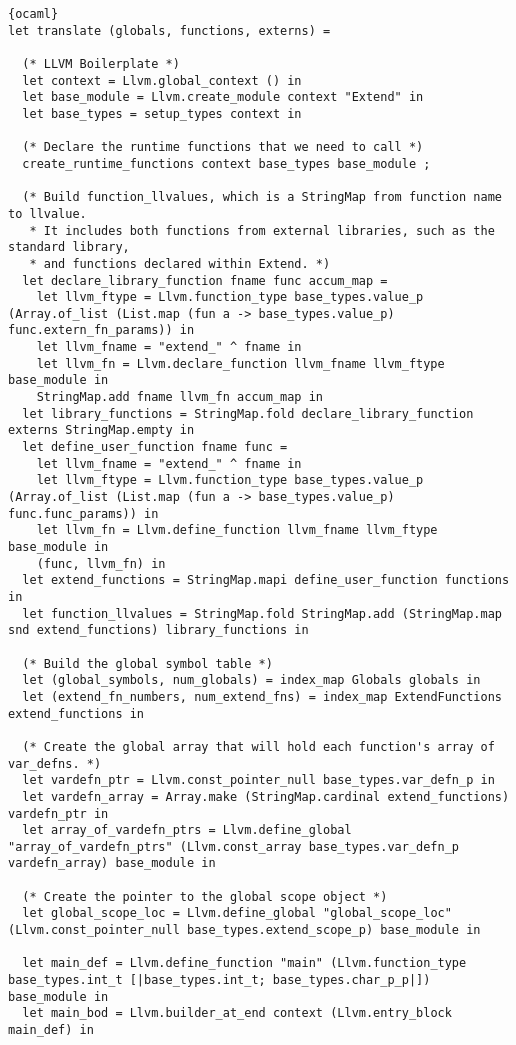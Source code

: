 \begin{lstlisting}{ocaml}
let translate (globals, functions, externs) =

  (* LLVM Boilerplate *)
  let context = Llvm.global_context () in
  let base_module = Llvm.create_module context "Extend" in
  let base_types = setup_types context in

  (* Declare the runtime functions that we need to call *)
  create_runtime_functions context base_types base_module ;

  (* Build function_llvalues, which is a StringMap from function name to llvalue.
   * It includes both functions from external libraries, such as the standard library,
   * and functions declared within Extend. *)
  let declare_library_function fname func accum_map =
    let llvm_ftype = Llvm.function_type base_types.value_p (Array.of_list (List.map (fun a -> base_types.value_p) func.extern_fn_params)) in
    let llvm_fname = "extend_" ^ fname in
    let llvm_fn = Llvm.declare_function llvm_fname llvm_ftype base_module in
    StringMap.add fname llvm_fn accum_map in
  let library_functions = StringMap.fold declare_library_function externs StringMap.empty in
  let define_user_function fname func =
    let llvm_fname = "extend_" ^ fname in
    let llvm_ftype = Llvm.function_type base_types.value_p (Array.of_list (List.map (fun a -> base_types.value_p) func.func_params)) in
    let llvm_fn = Llvm.define_function llvm_fname llvm_ftype base_module in
    (func, llvm_fn) in
  let extend_functions = StringMap.mapi define_user_function functions in
  let function_llvalues = StringMap.fold StringMap.add (StringMap.map snd extend_functions) library_functions in

  (* Build the global symbol table *)
  let (global_symbols, num_globals) = index_map Globals globals in
  let (extend_fn_numbers, num_extend_fns) = index_map ExtendFunctions extend_functions in

  (* Create the global array that will hold each function's array of var_defns. *)
  let vardefn_ptr = Llvm.const_pointer_null base_types.var_defn_p in
  let vardefn_array = Array.make (StringMap.cardinal extend_functions) vardefn_ptr in
  let array_of_vardefn_ptrs = Llvm.define_global "array_of_vardefn_ptrs" (Llvm.const_array base_types.var_defn_p vardefn_array) base_module in

  (* Create the pointer to the global scope object *)
  let global_scope_loc = Llvm.define_global "global_scope_loc" (Llvm.const_pointer_null base_types.extend_scope_p) base_module in

  let main_def = Llvm.define_function "main" (Llvm.function_type base_types.int_t [|base_types.int_t; base_types.char_p_p|]) base_module in
  let main_bod = Llvm.builder_at_end context (Llvm.entry_block main_def) in


\end{lstlisting}
